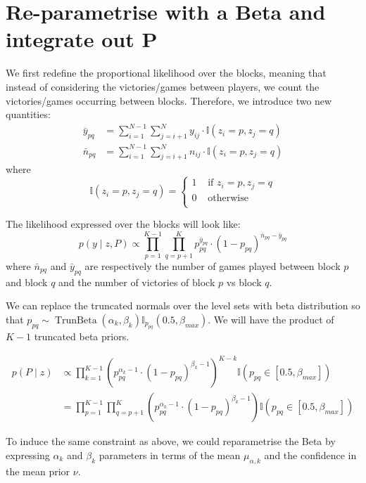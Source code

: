 \documentclass[11pt]{amsart}
\begin{document}
\section{Re-parametrise with a Beta and integrate out P}
We first redefine the proportional likelihood over the blocks, meaning that instead of considering the victories/games between players, we count the victories/games occurring between blocks. 
Therefore, we introduce two new quantities:
\begin{align}
\bar{y}_{pq} &= \sum_{i=1}^{N-1} \sum_{j=i+1}^{N} y_{ij} \cdot  \mathbb{I}\left(z_i = p, z_j =q \right)\\
\bar{n}_{pq} &= \sum_{i=1}^{N-1} \sum_{j=i+1}^{N} n_{ij} \cdot  \mathbb{I}\left(z_i = p, z_j =q \right)
\end{align}
where 
\[
\mathbb{I}\left(z_i = p, z_j =q \right) =
\begin{cases}
1 &\text{ if }z_i = p, z_j =q\\
0 &\text{ otherwise}\\
\end{cases}
\]

The likelihood expressed over the blocks will look like:
\[
p(y \mid z,P) \propto \prod_{p=1}^{K-1} \prod_{q=p+1}^K p_{pq}^{\bar{y}_{pq}} \cdot (1 - p_{pq})^{\bar{n}_{pq}- \bar{y}_{pq}} 
\]
where $\bar{n}_{pq}$ and $\bar{y}_{pq}$ are respectively the number of games played between block $p$ and block $q$ and the number of victories of block $p$ vs block $q$. 

We can replace the truncated normals over the level sets with beta distribution so that $p_{pq} \sim \operatorname{TrunBeta}\left(\alpha_k, \beta_k \right)\mathbb{I}_{p_{pq}}\left(0.5,\beta_{max}\right)$. 
We will have the product of $K-1$ truncated beta priors.

\begin{align}
p(P \mid z) &\propto \prod_{k=1}^{K-1} \left( p_{pq}^{\alpha_k-1} \cdot (1 - p_{pq})^{\beta_k -1} \right)^{K-k} \mathbb{I}\left(p_{pq} \in \left[0.5,\beta_{max}\right]\right)\\
&= \prod_{p=1}^{K-1}\prod_{q= p+1}^{K} \left( p_{pq}^{\alpha_k-1} \cdot (1 - p_{pq})^{\beta_k -1} \right) \mathbb{I}\left(p_{pq} \in \left[0.5,\beta_{max}\right]\right)
\end{align}

To induce the same constraint as above, we could reparametrise the Beta by expressing $\alpha_k$ and $\beta_k$ parameters in terms of the mean $\mu_{\alpha,k}$ and the confidence in the mean prior $\nu$. 
\end{document}
